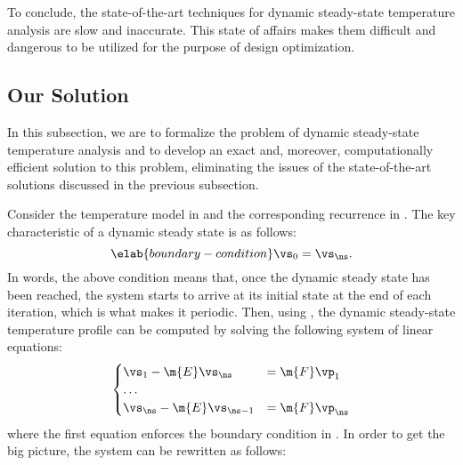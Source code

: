 To conclude, the state-of-the-art techniques for dynamic steady-state
temperature analysis are slow and inaccurate. This state of affairs makes them
difficult and dangerous to be utilized for the purpose of design optimization.

\subsection{Our Solution}

In this subsection, we are to formalize the problem of dynamic steady-state
temperature analysis and to develop an exact and, moreover, computationally
efficient solution to this problem, eliminating the issues of the
state-of-the-art solutions discussed in the previous subsection.

Consider the temperature model in  and the corresponding
recurrence in . The key characteristic of a
dynamic steady state is as follows:
\begin{equation} \elab{boundary-condition}
  \vs_0 = \vs_\ns.
\end{equation}
In words, the above condition means that, once the dynamic steady state has been
reached, the system starts to arrive at its initial state at the end of each
iteration, which is what makes it periodic. Then, using
, the dynamic steady-state temperature profile
can be computed by solving the following system of linear equations:
\[
  \begin{cases}
    \vs_1 - \m{E} \vs_\ns & = \m{F} \vp_1 \\
    \dots \\
    \vs_\ns - \m{E} \vs_{\ns - 1} & = \m{F} \vp_\ns
  \end{cases}
\]
where the first equation enforces the boundary condition in
. In order to get the big picture, the system can be
rewritten as follows:
